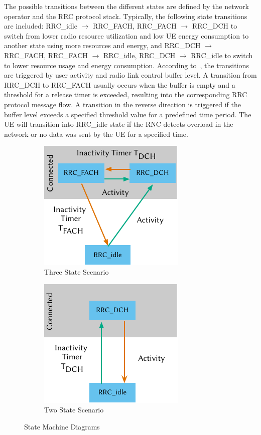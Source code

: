 The possible transitions between the different states are defined by the network operator and the \gls{RRC} protocol stack.
Typically, the following state transitions are included: 
\gls{RRC_idle} \(\rightarrow\) \gls{RRC_FACH},
\gls{RRC_FACH} \(\rightarrow\) \gls{RRC_DCH} to switch from lower radio resource utilization and low \gls{UE} energy consumption to another state using more resources and energy, and 
\gls{RRC_DCH} \(\rightarrow\) \gls{RRC_FACH}, 
\gls{RRC_FACH} \(\rightarrow\) \gls{RRC_idle},
\gls{RRC_DCH} \(\rightarrow\) \gls{RRC_idle} to switch to lower resource usage and energy consumption.
According to~\cite{Perala2009,Qian2010a}, the transitions are triggered by user activity and radio link control buffer level. 
A transition from \gls{RRC_DCH} to \gls{RRC_FACH} usually occurs when the buffer is empty and a threshold for a release timer is exceeded, resulting into the corresponding \gls{RRC} protocol message flow.
A transition in the reverse direction is triggered if the buffer level exceeds a specified threshold value for a predefined time period.
The \gls{UE} will transition into \gls{RRC_idle} state if the \gls{RNC} detects overload in the network or no data was sent by the \gls{UE} for a specified time.

\begin{figure}
	\begin{subfigure}[b]{.5\textwidth}
	\centering
	\includegraphics{network/background/figures/three_states}
	\caption{Three State Scenario}\label{fig:network:background:rrc_state_machines:three_states}
	\end{subfigure}
	\begin{subfigure}[b]{.5\textwidth}
	\centering
	\includegraphics{network/background/figures/two_states}
	\caption{Two State Scenario}\label{fig:network:background:rrc_state_machines:two_states}
	\end{subfigure}
	\caption{ State Machine Diagrams}\label{fig:network:background:rrc_state_machines}
\end{figure}

